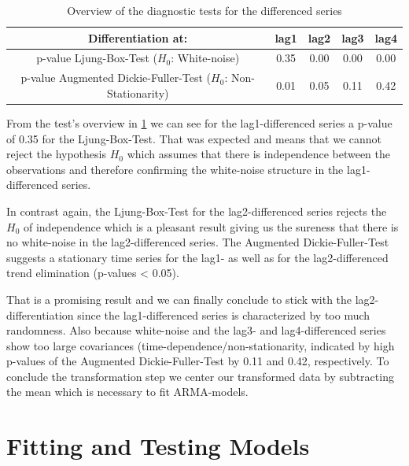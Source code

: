 \documentclass[11pt,a4paper]{article}
\begin{document}
\begin{table}
\centering
\begin{tabular}{c|cccc}
    Differentiation at:  & lag1 & lag2 & lag3 & lag4 \\
    \hline 
    \makecell{p-value Ljung-Box-Test\\($H_0$: White-noise)} & 0.35 & 0.00 & 0.00 & 0.00\\
    \makecell{p-value Augmented Dickie-Fuller-Test\\($H_0$: Non-Stationarity)} & 0.01 & 0.05 & 0.11 & 0.42\\
\end{tabular}
\caption{Overview of the diagnostic tests for the differenced series}
\label{table:overview_diffs}
\end{table}

From the test's overview in \cref{table:overview_diffs} we can see for the lag1-differenced series a p-value of 0.35 for the Ljung-Box-Test.
That was expected and means that we cannot reject the hypothesis $H_0$ which assumes that there is independence between the observations \citep{LjungBox78} and therefore confirming the white-noise structure in the lag1-differenced series. 

In contrast again, the Ljung-Box-Test for the lag2-differenced series rejects the $H_0$ of independence which is a pleasant result giving us the sureness that there is no white-noise in the lag2-differenced series.
The Augmented Dickie-Fuller-Test suggests a stationary time series for the lag1- as well as for the lag2-differenced trend elimination (p-values < 0.05).

That is a promising result and we can finally conclude to stick with the lag2-differentiation since the lag1-differenced series is characterized by too much randomness. Also because white-noise and the lag3- and lag4-differenced series show too large covariances (time-dependence/non-stationarity, indicated by high p-values of the Augmented Dickie-Fuller-Test by 0.11 and 0.42, respectively. To conclude the transformation step we center our transformed data by subtracting the mean which is necessary to fit ARMA-models.



\section{Fitting and Testing Models}
\label{sec:FitTestModel}
\end{document}
